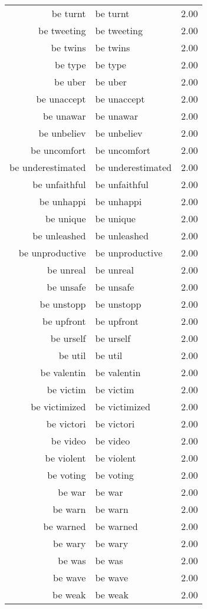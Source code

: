 \begin{table}[ht]
\begin{tabular}{rlr}
  be turnt & be turnt & 2.00 \\ 
  be tweeting & be tweeting & 2.00 \\ 
  be twins & be twins & 2.00 \\ 
  be type & be type & 2.00 \\ 
  be uber & be uber & 2.00 \\ 
  be unaccept & be unaccept & 2.00 \\ 
  be unawar & be unawar & 2.00 \\ 
  be unbeliev & be unbeliev & 2.00 \\ 
  be uncomfort & be uncomfort & 2.00 \\ 
  be underestimated & be underestimated & 2.00 \\ 
  be unfaithful & be unfaithful & 2.00 \\ 
  be unhappi & be unhappi & 2.00 \\ 
  be unique & be unique & 2.00 \\ 
  be unleashed & be unleashed & 2.00 \\ 
  be unproductive & be unproductive & 2.00 \\ 
  be unreal & be unreal & 2.00 \\ 
  be unsafe & be unsafe & 2.00 \\ 
  be unstopp & be unstopp & 2.00 \\ 
  be upfront & be upfront & 2.00 \\ 
  be urself & be urself & 2.00 \\ 
  be util & be util & 2.00 \\ 
  be valentin & be valentin & 2.00 \\ 
  be victim & be victim & 2.00 \\ 
  be victimized & be victimized & 2.00 \\ 
  be victori & be victori & 2.00 \\ 
  be video & be video & 2.00 \\ 
  be violent & be violent & 2.00 \\ 
  be voting & be voting & 2.00 \\ 
  be war & be war & 2.00 \\ 
  be warn & be warn & 2.00 \\ 
  be warned & be warned & 2.00 \\ 
  be wary & be wary & 2.00 \\ 
  be was & be was & 2.00 \\ 
  be wave & be wave & 2.00 \\ 
  be weak & be weak & 2.00 \\ 

\end{tabular}
\end{table}
